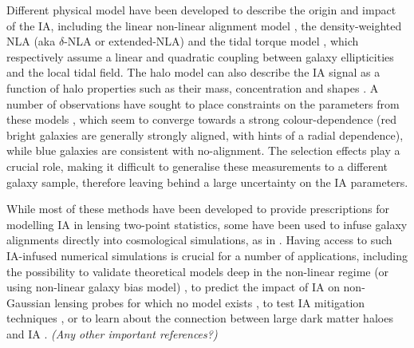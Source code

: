 \documentclass[useAMS,usenatbib]{mn2e}
\begin{document}
Different physical model have been developed to describe the origin and impact of the IA, including the linear non-linear alignment model \citep[][NLA hereafter]{BridleKing07}, the density-weighted NLA (aka $\delta$-NLA or extended-NLA) and the tidal torque model \citep[][TT hereafter]{Blazek2017}, which respectively assume a linear and quadratic coupling between galaxy ellipticities and the local tidal field. The halo model can also describe the IA signal as a function of halo properties such as their mass, concentration and shapes \citep{FortunaIA}. A number of observations have sought to place constraints on the parameters from these models \citep[e.g.][]{Singh, Sammuroff, Sammuroff, Christos, Fortuna, Johnston}, which seem to converge towards a strong colour-dependence (red bright galaxies are generally strongly aligned, with hints of a radial dependence), while blue galaxies are consistent with no-alignment. The selection effects play a crucial role, making it difficult to generalise these measurements to a different galaxy sample, therefore leaving behind a large uncertainty on the IA parameters.


While most of these methods have been developed to provide prescriptions for modelling IA in lensing  two-point statistics, some have been used to infuse galaxy alignments directly into cosmological simulations, as in \citet{Fluri2019, Tidalator2D, MICE_IA, Borg, Lanzieri}.  Having access to such IA-infused numerical simulations is crucial for a number of applications, including the possibility to validate theoretical models deep in the non-linear regime (or using non-linear galaxy bias model) \citep{IA_gal_bias}, to predict the impact of IA on non-Gaussian lensing probes  for which no model exists \citep{ZuercherXYZ, Tidalator2D}, to test IA mitigation techniques \citep{IA_selfCalibration}, or to learn about  the connection between large dark matter haloes and IA  \citep{vanAlfen}.  {\it (Any other important references?)}
\end{document}
